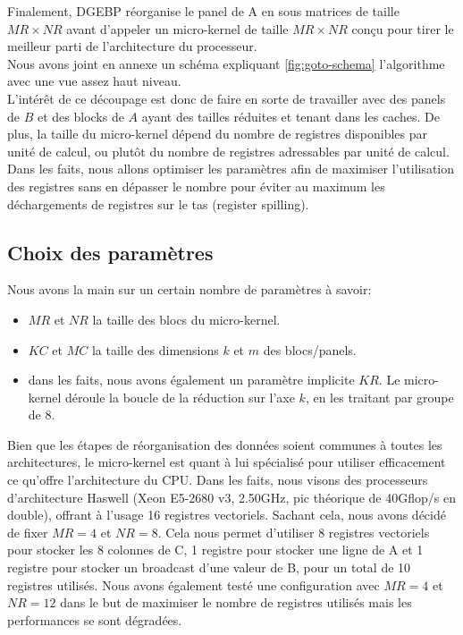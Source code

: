 Finalement, DGEBP réorganise le panel de A en sous matrices de taille $MR\times NR$ avant  d'appeler un micro-kernel de taille $MR\times NR$ conçu pour tirer le meilleur parti de l'architecture du processeur.\\

Nous avons joint en annexe un schéma expliquant \ref{fig:goto-schema} l'algorithme avec une vue assez haut niveau.\\

L'intérêt de ce découpage est donc de faire en sorte de travailler avec des panels de $B$ et des blocks de $A$ ayant des tailles réduites et tenant dans les caches. De plus, la taille du micro-kernel dépend du nombre de registres disponibles par unité de calcul, ou plutôt du nombre de registres adressables par unité de calcul. Dans les faits, nous allons optimiser les paramètres afin de maximiser l'utilisation des registres sans en dépasser le nombre pour éviter au maximum les déchargements de registres sur le tas (register spilling).\\

\subsection{Choix des paramètres}
Nous avons la main sur un certain nombre de paramètres à savoir:
\begin{itemize}
    \item $MR$ et $NR$ la taille des blocs du micro-kernel.
    \item $KC$ et $MC$ la taille des dimensions $k$ et $m$ des blocs/panels.
    \item dans les faits, nous avons également un paramètre implicite $KR$. Le micro-kernel déroule la boucle de la réduction sur l'axe $k$, en les traitant par groupe de 8.
\end{itemize}

Bien que les étapes de réorganisation des données soient communes à toutes les architectures, le micro-kernel est quant à lui spécialisé pour utiliser efficacement ce qu'offre  l'architecture du CPU. Dans les faits, nous visons des processeurs d'architecture Haswell (Xeon E5-2680 v3, 2.50GHz, pic théorique de 40Gflop/s en double), offrant à l'usage 16 registres vectoriels. Sachant cela, nous avons décidé de fixer $MR=4$ et $NR=8$. Cela nous permet d'utiliser 8 registres vectoriels pour stocker les 8 colonnes de C, 1 registre pour stocker une ligne de A et 1 registre pour stocker un broadcast d'une valeur de B, pour un total de 10 registres utilisés. Nous avons également testé une configuration avec $MR=4$ et $NR=12$ dans le but de maximiser le nombre de registres utilisés mais les performances se sont dégradées. \\

